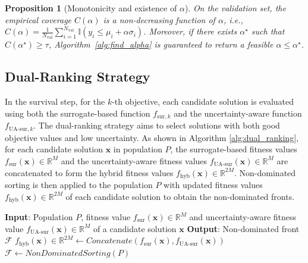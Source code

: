 \documentclass{article}
\newtheorem{proposition}{Proposition}
\begin{document}
\begin{proposition}[Monotonicity and existence of $\alpha$]
\label{prop:alpha}
On the validation set, the empirical coverage $C(\alpha)$ is a non-decreasing function of $\alpha$, \emph{i.e.},
$
C(\alpha)
= \frac{1}{N_{\mathrm{val}}}
\sum_{i=1}^{N_{\mathrm{val}}}
\mathbb{I}\!\left(
y_i \le \mu_i + \alpha \sigma_i
\right)
$. Moreover, if there exists $\alpha^\star$ such that
$C(\alpha^\star) \ge \tau$,
Algorithm~\ref{alg:find_alpha} is guaranteed to return a feasible
$\alpha \le \alpha^\star$.
\end{proposition}


\subsection{Dual-Ranking Strategy}
In the survival step, for the $k$-th objective, each candidate solution is evaluated using both the surrogate-based function $f_{\text{sur},k}$ and the uncertainty-aware function $f_{\text{UA-sur},k}$. The dual-ranking strategy aims to select solutions with both good objective values and low uncertainty. As shown in Algorithm \ref{alg:dual_ranking}, for each candidate solution $\boldsymbol{x}$ in population $P$, the surrogate-based fitness values $f_{\text{sur}}(\boldsymbol{x}) \in \mathbb{R}^{M}$ and the uncertainty-aware fitness values $f_{\text{UA-sur}}(\boldsymbol{x}) \in \mathbb{R}^{M}$ are concatenated to form the hybrid fitness values $f_{\text{hyb}}(\boldsymbol{x}) \in \mathbb{R}^{2M}$. Non-dominated sorting is then applied to the population $P$ with updated fitness values $f_{\text{hyb}}(\boldsymbol{x}) \in \mathbb{R}^{2M}$ of each candidate solution to obtain the non-dominated fronts. 

\begin{algorithm}[htbp]
\caption{Dual-Ranking}
\label{alg:dual_ranking}
\begin{algorithmic}[1]
\STATE \textbf{Input}: Population $P$, fitness value $f_{\text{sur}}(\boldsymbol{x}) \in \mathbb{R}^{M}$ and uncertainty-aware fitness value $f_{\text{UA-sur}}(\boldsymbol{x}) \in \mathbb{R}^{M}$ of a candidate solution $\boldsymbol{x}$
\STATE \textbf{Output}: Non-dominated front $\mathcal{F}$
  \STATE $f_{\text{hyb}}(\boldsymbol{x}) \in \mathbb{R}^{2M} 
\gets \textit{Concatenate}(f_{\text{sur}}(\boldsymbol{x}), f_{\text{UA-sur}}(\boldsymbol{x}))$
\ENDFOR
\STATE $\mathcal{F} \gets \textit{NonDominatedSorting}(P)$
\end{algorithmic}
\end{algorithm}
\end{document}
